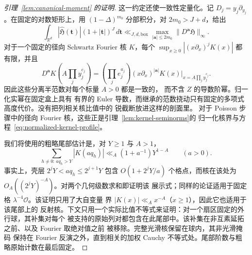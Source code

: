 \documentclass[11pt,a4paper]{article}
\numberwithin{equation}{section}
\numberwithin{figure}{section}
\theoremstyle{definition}
\theoremstyle{remark}
\begin{document}
\begin{proof}[引理~\ref{lem:canonical-moment} 的证明]
这一约定还使一致性定量化。记
\(D_j=y_j\partial_{y_j}\)。在固定的对数矩形上，用 \((1-\Delta)^{m_0}\) 分部积分，对 \(2m_0>J+d\)，给出
\begin{equation}\label{eq:inverse-fourier-moment}
 \int_{\mathbb R^d}|\widehat{\mathfrak H}(\boldsymbol t)|
        (1+|\boldsymbol t|)^J\,d\boldsymbol t
 \ll_{J,d,\mathrm{box}}\max_{|\boldsymbol a|\le2m_0}
             \|D^{\boldsymbol a}\mathfrak H\|_\infty.
\end{equation}
对于一个固定的径向 Schwartz Fourier 核 \(K\)，每个
\(\sup_{x\ge0}|(x\partial_x)^jK(x)|\) 都有限，并且
\[
 D^{\boldsymbol a}K\!\left(A\prod_jy_j^{e_j}\right)
 =\left(\prod_je_j^{a_j}\right)
   (x\partial_x)^{|\boldsymbol a|}K(x)
       \big|_{x=A\prod_jy_j^{e_j}}.
\]
因此这些分离半范数对每个标量 \(A>0\) 都是一致的，
而不含 \(Z\) 的导数阶幂。归一化实幂在固定盒上具有
有界的 Euler 导数，而继承的范数挠动只有固定的多项式高度代价。没有把列相关核比值中的
锐截断放进这样的剖面里。
对于 Poisson 步骤中的径向 Fourier 核，这些正是引理~\ref{lem:kernel-seminorms}的
归一化核界与方程~\eqref{eq:normalized-kernel-profile}。

我们将使用的粗略尾部估计是，对 \(Y\ge1\) 与 \(A>1\)，
\begin{equation}\label{eq:inverse-raw-tail}
 \sum_{h\ne0:\,a q_h>Y}|K(aq_h)|
 \ll_A(1+a^{-1})Y^{1-A}\qquad(a>0).
\end{equation}
事实上，壳层 \(2^jY<a q_h\le2^{j+1}Y\) 包含
\(O(1+2^jY/a)\) 个格点，而核在该处为
\(O_A((2^jY)^{-A})\)。对两个几何级数求和即证明该
展示式；同样的论证适用于固定格
\(\lambda^{-4}\mathcal O\)。该证明只用了大自变量
界 \(|K(x)|\ll_Ax^{-A}\)（\(x\ge1\)），因此它也适用于该尾部上的
反射核。下文只用一个实际比值不等式来证明：对一个扇区固定的外行球，其补集对每个
被支持的原始列对都包含在此尾部中。该补集在非互素延拓之前、以及 Fourier 取绝对值之前
被移除。完整光滑核保留在球内，其非光滑掩码
保持在 Fourier 反演之外，直到相关的加权 Cauchy
不等式处。尾部阶数与粗略原始计数在最后固定。


\end{proof}
\end{document}
